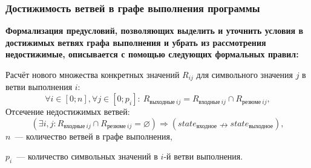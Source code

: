 \documentclass[hyperref={pdfpagelabels=false},10pt,gray]{beamer}
\begin{document}

\begin{frame}
\frametitle{Достижимость ветвей в графе выполнения программы}

\textbf{Формализация предусловий, позволяющих выделить и уточнить условия в достижимых ветвях графа выполнения и убрать из рассмотрения недостижимые, описывается с помощью следующих формальных правил: }

\vspace{20pt}

Расчёт нового множества конкретных значений $R_{ij}$ для символьного значения $j$ в ветви выполнения $i$:
\begin{equation*}
\label{result_sval}
 \forall i \in [0; n], \forall j \in [0; p_i]:\ R_{\text{выходные}\ ij} =  R_{\text{входные}\ ij} \cap R_{\text{резюме}\ ij},
\end{equation*}
Отсечение недостижимых ветвей:
\begin{equation*}
 \label{empty_set}
 (\exists i, j: R_{\text{входные}\ ij} \cap R_{\text{резюме}\ ij} = \varnothing)  \Rightarrow (state_{\text{входное}} \nrightarrow state_{\text{выходное}}),
\end{equation*}
$n$~--- количество ветвей в графе выполнения,

$p_{i}$~--- количество символьных значений в $i$-й ветви выполнения.


\end{frame}

\end{document}
